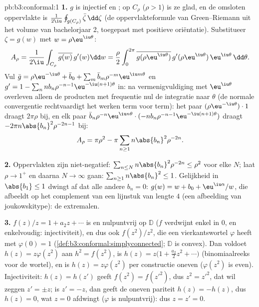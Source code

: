 \begin{solution}{pb:b3:conformal:1}
\textbf{1.} $g$ is injectief en ; op $C_\rho$ ($\rho >
1$) is ze glad, en de omsloten oppervlakte is
$\frac1{2\iu}\oint_{g(C_\rho)}\bar\zeta\,\dd\zeta$ (de
oppervlakteformule van Green--Riemann uit het volume van
bachelorjaar 2, toegepast met positieve oriëntatie). Substitueer
$\zeta = g(w)$ met $w = \rho\eu^{\iu\theta}$:
\[
A_\rho = \frac1{2\iu}\int_{C_\rho}\overline{g(w)}\,g'(w)\dd
w = \frac\rho2\int_0^{2\pi}\overline{g(\rho\eu^{\iu\theta})}
\,g'(\rho\eu^{\iu\theta})\,\eu^{\iu\theta}\,\dd\theta .
\]
Vul $\bar g = \rho\eu^{-\iu\theta} + \bar b_0 + \sum_m\bar
b_m\rho^{-m}\eu^{\iu m\theta}$ en $g' = 1 -
\sum_nnb_n\rho^{-n-1}\eu^{-\iu(n+1)\theta}$ in: na
vermenigvuldiging met $\eu^{\iu\theta}$ overleven alleen de
producten met frequentie nul de integratie naar $\theta$ (de
normale convergentie rechtvaardigt het werken term voor term):
het paar $(\rho\eu^{-\iu\theta})\cdot1$ draagt $2\pi\rho$ bij, en
elk paar $\bar b_n\rho^{-n}\eu^{\iu n\theta}\cdot
(-nb_n\rho^{-n-1}\eu^{-\iu(n+1)\theta})$ draagt $-2\pi
n\abs{b_n}^2\rho^{-2n-1}$ bij:
\[
A_\rho = \pi\rho^2 - \pi\sum_{n\geq1}n\abs{b_n}^2\rho^{-2n}.
\]

\textbf{2.} Oppervlakten zijn niet-negatief: $\sum_{n\leq
N}n\abs{b_n}^2\rho^{-2n} \leq \rho^2$ voor elke $N$; laat $\rho
\to 1^+$ en daarna $N \to \infty$ gaan:
$\sum_{n\geq1}n\abs{b_n}^2 \leq 1$. Gelijkheid in $\abs{b_1} \leq
1$ dwingt af dat alle andere $b_n = 0$: $g(w) = w + b_0 +
\eu^{\iu\alpha}/w$, die afbeeldt op het complement van een
lijnstuk van lengte $4$ (een afbeelding van joukowskitype): de
extremalen.

\textbf{3.} $f(z)/z = 1 + a_2z + \cdots$ is  en
nulpuntvrij op $\mathbb D$ ($f$ verdwijnt enkel in $0$, en
enkelvoudig: injectiviteit), en dus ook $f(z^2)/z^2$, die een
 vierkantswortel $\varphi$ heeft met $\varphi(0) = 1$
(\cref{def:b3:conformal:simplyconnected}; $\mathbb D$ is convex).
Dan voldoet $h(z) = z\varphi(z^2)$ aan $h^2 = f(z^2)$, is $h(z) =
z\bigl(1 + \frac{a_2}2z^2 + \cdots\bigr)$ (binomiaalreeks voor de
wortel), en is $h(z) = z\varphi(z^2)$ per constructie oneven
($\varphi(z^2)$ is even). Injectiviteit: $h(z) = h(z')$ geeft
$f(z^2) = f(z'^2)$, dus $z^2 = z'^2$, dat wil zeggen $z' = \pm
z$; is $z' = -z$, dan geeft de oneven pariteit $h(z) = -h(z)$,
dus $h(z) = 0$, wat $z = 0$ afdwingt ($\varphi$ is
nulpuntvrij): dus $z = z' = 0$.


\end{solution}
